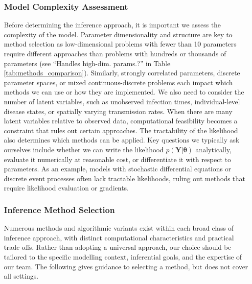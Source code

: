 \documentclass{article}
\begin{document}
\subsubsection{Model Complexity Assessment}

Before determining the inference approach, it is important we assess the complexity of the model.
Parameter dimensionality and structure are key to method selection as low-dimensional problems with fewer than 10 parameters require different approaches than problems with hundreds or thousands of parameters (see ``Handles high-dim. params.?'' in Table \ref{tab:methods_comparison}).
Similarly, strongly correlated parameters, discrete parameter spaces, or mixed continuous-discrete problems each impact which methods we can use or how they are implemented.
We also need to consider the number of latent variables, such as unobserved infection times, individual-level disease states, or spatially varying transmission rates.
When there are many latent variables relative to observed data, computational feasibility becomes a constraint that rules out certain approaches.
The tractability of the likelihood also determines which methods can be applied.
Key questions we typically ask ourselves include whether we can write the likelihood $p(\boldsymbol{Y}|\boldsymbol{\theta})$ analytically, evaluate it numerically at reasonable cost, or differentiate it with respect to parameters.
As an example, models with stochastic differential equations or discrete event processes often lack tractable likelihoods, ruling out methods that require likelihood evaluation or gradients.

\subsubsection{Inference Method Selection}

Numerous methods and algorithmic variants exist within each broad class of inference approach, with distinct computational characteristics and practical trade-offs.
Rather than adopting a universal approach, our choice should be tailored to the specific modelling context, inferential goals, and the expertise of our team.
The following gives guidance to selecting a method, but does not cover all settings.
\end{document}
